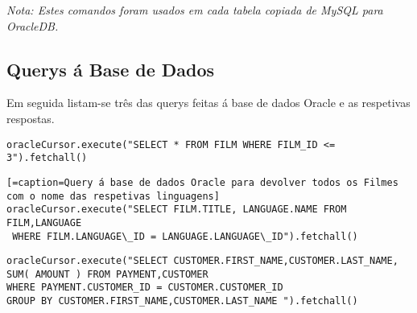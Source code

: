 \textit{Nota: Estes comandos foram usados em cada tabela copiada de MySQL para OracleDB.}

\subsection{Querys á Base de Dados}

Em seguida listam-se três das querys feitas á base de dados Oracle e as respetivas respostas.


\begin{lstlisting}[caption=Query á base de dados Oracle para devolver todos os Filmes com id inferior ou igual a 3]
oracleCursor.execute("SELECT * FROM FILM WHERE FILM_ID <= 3").fetchall()
\end{lstlisting}


\begin{lstlisting}[=caption=Query á base de dados Oracle para devolver todos os Filmes com o nome das respetivas linguagens]
oracleCursor.execute("SELECT FILM.TITLE, LANGUAGE.NAME FROM FILM,LANGUAGE
 WHERE FILM.LANGUAGE\_ID = LANGUAGE.LANGUAGE\_ID").fetchall()
\end{lstlisting}


\begin{lstlisting}[caption=Query á base de dados Oracle para devolver o total faturado por utilizador]
oracleCursor.execute("SELECT CUSTOMER.FIRST_NAME,CUSTOMER.LAST_NAME,
SUM( AMOUNT ) FROM PAYMENT,CUSTOMER 
WHERE PAYMENT.CUSTOMER_ID = CUSTOMER.CUSTOMER_ID 
GROUP BY CUSTOMER.FIRST_NAME,CUSTOMER.LAST_NAME ").fetchall()
\end{lstlisting}













